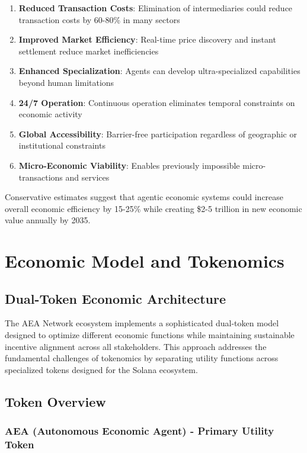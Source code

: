 \documentclass[12pt,a4paper]{article}
\begin{document}
\begin{enumerate}
\item \textbf{Reduced Transaction Costs}: Elimination of intermediaries could reduce transaction costs by 60-80\% in many sectors
\item \textbf{Improved Market Efficiency}: Real-time price discovery and instant settlement reduce market inefficiencies
\item \textbf{Enhanced Specialization}: Agents can develop ultra-specialized capabilities beyond human limitations
\item \textbf{24/7 Operation}: Continuous operation eliminates temporal constraints on economic activity
\item \textbf{Global Accessibility}: Barrier-free participation regardless of geographic or institutional constraints
\item \textbf{Micro-Economic Viability}: Enables previously impossible micro-transactions and services
\end{enumerate}

Conservative estimates suggest that agentic economic systems could increase overall economic efficiency by 15-25\% while creating \$2-5 trillion in new economic value annually by 2035.

\section{Economic Model and Tokenomics}

\subsection{Dual-Token Economic Architecture}

The AEA Network ecosystem implements a sophisticated dual-token model designed to optimize different economic functions while maintaining sustainable incentive alignment across all stakeholders. This approach addresses the fundamental challenges of tokenomics by separating utility functions across specialized tokens designed for the Solana ecosystem.

\subsection{Token Overview}

\subsubsection{AEA (Autonomous Economic Agent) - Primary Utility Token}
\end{document}
